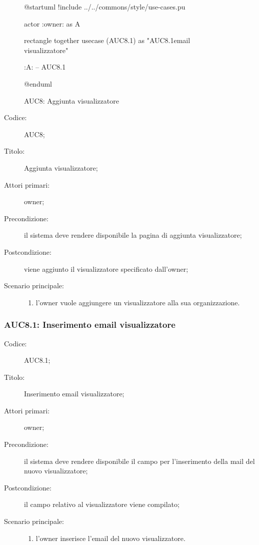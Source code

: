 \documentclass[../../../analisi-dei-requisiti.tex]{subfiles}
\begin{document}
\begin{figure}[H]
  \centering
  \begin{plantuml}
  @startuml
  !include ../../commons/style/use-cases.pu

  actor :owner: as A

  rectangle {
    together {
      usecase (AUC8.1) as "AUC8.1\nInserimento email visualizzatore"
    }
  }

  :A: -- AUC8.1

  @enduml
  \end{plantuml}
  \caption{AUC8: Aggiunta visualizzatore}%
  \label{fig:AUC8}
\end{figure}

\begin{description}
  \item[Codice:] AUC8;
  \item[Titolo:] Aggiunta visualizzatore;
  \item[Attori primari:] owner;
  \item[Precondizione:] il sistema deve rendere disponibile la pagina di aggiunta visualizzatore;
  \item[Postcondizione:] viene aggiunto il visualizzatore specificato dall'owner;
  \item[Scenario principale:]
  \begin{enumerate}
    \item l'owner vuole aggiungere un visualizzatore alla sua organizzazione.
  \end{enumerate}
\end{description}

\subsubsection{AUC8.1: Inserimento email visualizzatore}%
\label{subs:AUC8.1}
\begin{description}
  \item[Codice:] AUC8.1;
  \item[Titolo:] Inserimento email visualizzatore;
  \item[Attori primari:] owner;
  \item[Precondizione:] il sistema deve rendere disponibile il campo per l'inserimento della mail del nuovo visualizzatore;
  \item[Postcondizione:] il campo relativo al visualizzatore viene compilato;
  \item[Scenario principale:]
  \begin{enumerate}
    \item l'owner inserisce l'email del nuovo visualizzatore.
  \end{enumerate}
\end{description}
\end{document}
